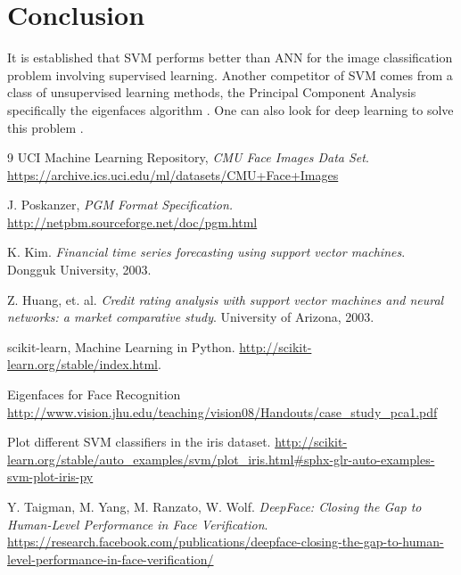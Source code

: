 \documentclass[11pt,a4paper]{article}
\begin{document}
	\section{Conclusion}
	It is established that SVM performs better than ANN for the image classification problem involving supervised learning. Another competitor of SVM comes from a class of unsupervised learning methods, the Principal Component Analysis specifically the eigenfaces algorithm \cite{bib:pca}. One can also look for deep learning to solve this problem \cite{bib:img}.
	
	\begin{thebibliography}{9}
		 UCI Machine Learning Repository, \textit{CMU Face Images Data Set}. \url{ https://archive.ics.uci.edu/ml/datasets/CMU+Face+Images}
		
		 J. Poskanzer, \textit{PGM Format Specification.} \url{http://netpbm.sourceforge.net/doc/pgm.html}
		
		 K. Kim. \textit{Financial time series forecasting using support vector machines}. Dongguk University, 2003.
		
		 Z. Huang, et. al. \textit{Credit rating analysis with support vector machines and neural networks: a market comparative study}. University of Arizona, 2003.
		
		 scikit-learn, Machine Learning in Python. \url{http://scikit-learn.org/stable/index.html}.
		
		 Eigenfaces for Face Recognition \url{http://www.vision.jhu.edu/teaching/vision08/Handouts/case_study_pca1.pdf}
		
		 Plot different SVM classifiers in the iris dataset. \url{http://scikit-learn.org/stable/auto_examples/svm/plot_iris.html#sphx-glr-auto-examples-svm-plot-iris-py}
		
		 Y. Taigman, M. Yang, M. Ranzato, W. Wolf. \textit{DeepFace: Closing the Gap to Human-Level Performance in Face Verification}. \url{https://research.facebook.com/publications/deepface-closing-the-gap-to-human-level-performance-in-face-verification/}
	\end{thebibliography}
	
\end{document}
